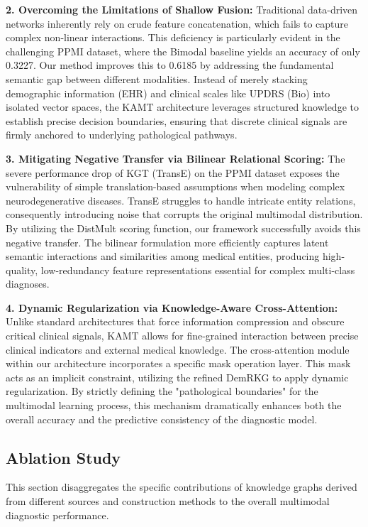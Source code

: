 \documentclass[lettersize,journal]{IEEEtran}
\begin{document}
\textbf{2. Overcoming the Limitations of Shallow Fusion:}
Traditional data-driven networks inherently rely on crude feature concatenation, which fails to capture complex non-linear interactions. This deficiency is particularly evident in the challenging PPMI dataset, where the Bimodal baseline yields an accuracy of only 0.3227. Our method improves this to 0.6185 by addressing the fundamental semantic gap between different modalities. Instead of merely stacking demographic information (EHR) and clinical scales like UPDRS (Bio) into isolated vector spaces, the KAMT architecture leverages structured knowledge to establish precise decision boundaries, ensuring that discrete clinical signals are firmly anchored to underlying pathological pathways.

\textbf{3. Mitigating Negative Transfer via Bilinear Relational Scoring:}
The severe performance drop of KGT (TransE) on the PPMI dataset exposes the vulnerability of simple translation-based assumptions when modeling complex neurodegenerative diseases. TransE struggles to handle intricate entity relations, consequently introducing noise that corrupts the original multimodal distribution. By utilizing the DistMult scoring function, our framework successfully avoids this negative transfer. The bilinear formulation more efficiently captures latent semantic interactions and similarities among medical entities, producing high-quality, low-redundancy feature representations essential for complex multi-class diagnoses.

\textbf{4. Dynamic Regularization via Knowledge-Aware Cross-Attention:}
Unlike standard architectures that force information compression and obscure critical clinical signals, KAMT allows for fine-grained interaction between precise clinical indicators and external medical knowledge. The cross-attention module within our architecture incorporates a specific mask operation layer. This mask acts as an implicit constraint, utilizing the refined DemRKG to apply dynamic regularization. By strictly defining the "pathological boundaries" for the multimodal learning process, this mechanism dramatically enhances both the overall accuracy and the predictive consistency of the diagnostic model.






\subsection{Ablation Study}
This section disaggregates the specific contributions of knowledge graphs derived from different sources and construction methods to the overall multimodal diagnostic performance.
\end{document}
